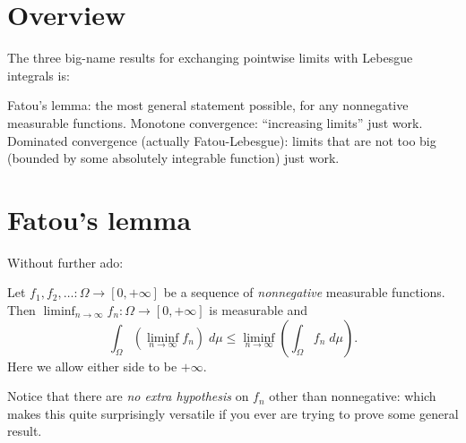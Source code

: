 \section{Overview}
The three big-name results for exchanging
pointwise limits with Lebesgue integrals is:
\begin{itemize}
	\ii Fatou's lemma: the most general statement possible,
	for any nonnegative measurable functions.
	\ii Monotone convergence: ``increasing limits'' just work.
	\ii Dominated convergence (actually Fatou-Lebesgue):
	limits that are not too big
	(bounded by some absolutely integrable function) just work.
\end{itemize}

\section{Fatou's lemma}
Without further ado:
\begin{lemma}
	Let $f_1, f_2, \dots \colon \Omega \to [0,+\infty]$
	be a sequence of \emph{nonnegative} measurable functions.
	Then $\liminf_{n \to \infty} f_n \colon \Omega \to [0,+\infty]$ is measurable and
	\[ \int_\Omega \left( \liminf_{n \to \infty} f_n \right) \; d\mu
		\le \liminf_{n \to \infty} \left( \int_\Omega f_n \; d\mu \right).  \]
	Here we allow either side to be $+\infty$.
\end{lemma}
Notice that there are \emph{no extra hypothesis}
on $f_n$ other than nonnegative: which makes this quite surprisingly versatile
if you ever are trying to prove some general result.

